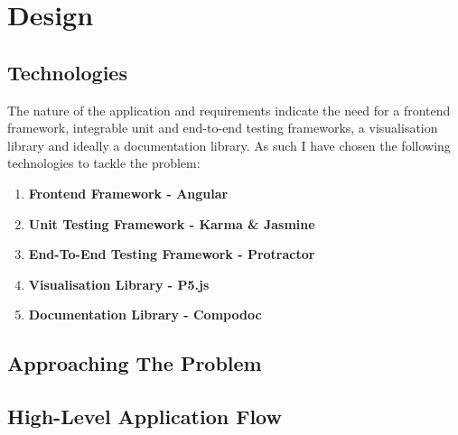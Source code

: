 \chapter{Design}

\section{Technologies}

The nature of the application and requirements indicate the need for a frontend framework, integrable unit and end-to-end testing frameworks, a visualisation library and ideally a documentation library. As such I have chosen the following technologies to tackle the problem:
\begin{enumerate}
    \item \textbf{Frontend Framework - Angular}
    \item \textbf{Unit Testing Framework - Karma \& Jasmine}
    \item \textbf{End-To-End Testing Framework - Protractor}
    \item \textbf{Visualisation Library - P5.js}
    \item \textbf{Documentation Library - Compodoc}
\end{enumerate}


\section{Approaching The Problem}



\section{High-Level Application Flow}

